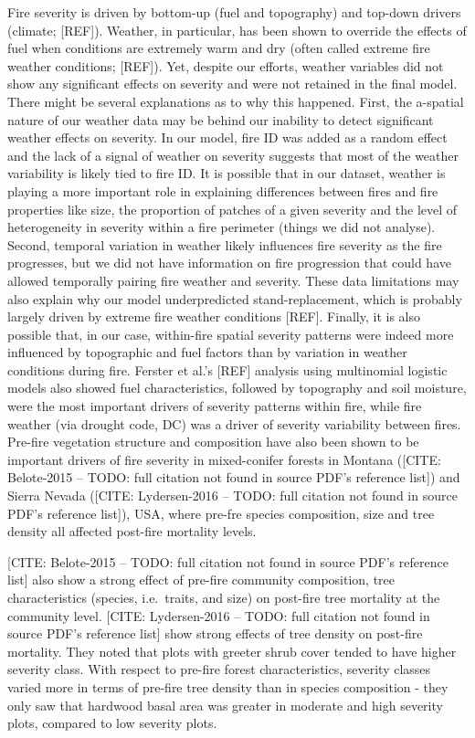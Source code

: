 \documentclass[
  numafflabel,
  authoryear,
  preprint]{elsarticle}
\begin{document}
Fire severity is driven by bottom-up (fuel and topography) and top-down
drivers (climate; {[}REF{]}). Weather, in particular, has been shown to
override the effects of fuel when conditions are extremely warm and dry
(often called extreme fire weather conditions; {[}REF{]}). Yet, despite
our efforts, weather variables did not show any significant effects on
severity and were not retained in the final model. There might be
several explanations as to why this happened. First, the a-spatial
nature of our weather data may be behind our inability to detect
significant weather effects on severity. In our model, fire ID was added
as a random effect and the lack of a signal of weather on severity
suggests that most of the weather variability is likely tied to fire ID.
It is possible that in our dataset, weather is playing a more important
role in explaining differences between fires and fire properties like
size, the proportion of patches of a given severity and the level of
heterogeneity in severity within a fire perimeter (things we did not
analyse). Second, temporal variation in weather likely influences fire
severity as the fire progresses, but we did not have information on fire
progression that could have allowed temporally pairing fire weather and
severity. These data limitations may also explain why our model
underpredicted stand-replacement, which is probably largely driven by
extreme fire weather conditions {[}REF{]}. Finally, it is also possible
that, in our case, within-fire spatial severity patterns were indeed
more influenced by topographic and fuel factors than by variation in
weather conditions during fire. Ferster et al.'s {[}REF{]} analysis
using multinomial logistic models also showed fuel characteristics,
followed by topography and soil moisture, were the most important
drivers of severity patterns within fire, while fire weather (via
drought code, DC) was a driver of severity variability between fires.
Pre-fire vegetation structure and composition have also been shown to be
important drivers of fire severity in mixed-conifer forests in Montana
({[}CITE: Belote-2015 -- TODO: full citation not found in source PDF's
reference list{]}) and Sierra Nevada ({[}CITE: Lydersen-2016 -- TODO:
full citation not found in source PDF's reference list{]}), USA, where
pre-fre species composition, size and tree density all affected
post-fire mortality levels.

{[}CITE: Belote-2015 -- TODO: full citation not found in source PDF's
reference list{]} also show a strong effect of pre-fire community
composition, tree characteristics (species, i.e.~traits, and size) on
post-fire tree mortality at the community level. {[}CITE: Lydersen-2016
-- TODO: full citation not found in source PDF's reference list{]} show
strong effects of tree density on post-fire mortality. They noted that
plots with greeter shrub cover tended to have higher severity class.
With respect to pre-fire forest characteristics, severity classes varied
more in terms of pre-fire tree density than in species composition -
they only saw that hardwood basal area was greater in moderate and high
severity plots, compared to low severity plots.
\end{document}
